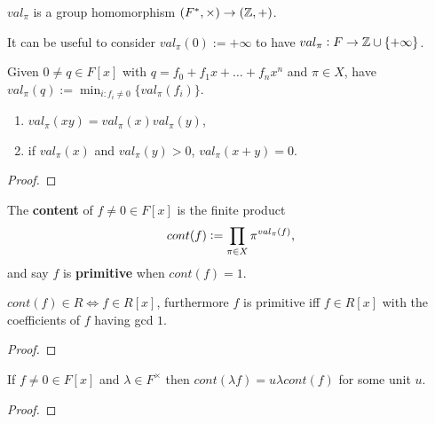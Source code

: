 \documentclass{report}
\begin{document}
\begin{proposition}
    $val_\pi$ is a group homomorphism $(F^*,\times)\rightarrow(\mathbb{Z},+)$.
\end{proposition}

\begin{remark}
    It can be useful to consider $val_\pi(0):=+\infty$ to have $val_\pi:F\rightarrow\mathbb{Z}\cup\{+\infty\}$.
\end{remark}

\begin{definition}
    Given $0\neq q\in F[x]$ with $q=f_0+f_1x+\ldots+f_nx^n$ and $\pi\in X$, have $\displaystyle val_\pi(q):=\min_{i:f_i\neq0}\{val_\pi(f_i)\}$.
\end{definition}

\begin{lemma}
    \begin{enumerate}
        \item $val_\pi(xy)=val_\pi(x)val_\pi(y)$,
        \item if $val_\pi(x)$ and $val_\pi(y)>0$, $val_\pi(x+y)=0$.
    \end{enumerate}\begin{proof}
        
    \end{proof}
\end{lemma}

\begin{definition}[Content]
    The \textbf{content} of $f\neq0\in F[x]$ is the finite product \[
        cont(f):=\prod_{\pi\in X}\pi^{val_\pi(f)}\text{\textcolor{black}{,}}
    \] and say $f$ is \textbf{primitive} when $cont(f)=1$.
\end{definition}

\begin{lemma}
    $cont(f)\in R \iff f\in R[x]$, furthermore $f$ is primitive iff $f\in R[x]$ with the coefficients of $f$ having gcd $1$. \begin{proof}
        
    \end{proof}
\end{lemma}

\begin{lemma}
    If $f\neq 0\in F[x]$ and $\lambda\in F^\times$ then $cont(\lambda f)=u\lambda cont(f)$ for some unit $u$. \begin{proof}
        
    \end{proof}
\end{lemma}
\end{document}
